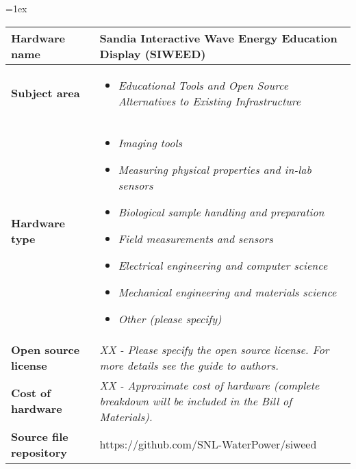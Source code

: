 \documentclass[11pt, letterpaper]{article}
\begin{document}
\begin{flushleft}
\tabulinesep=1ex
\begin{tabu} to \linewidth {|X|X[3,l]|}
\hline  \textbf{Hardware name} & Sandia Interactive Wave Energy Education Display (SIWEED)
  \\
  \hline \textbf{Subject area} & %
  \begin{itemize}
  \item \textit{Educational Tools and Open Source Alternatives to Existing Infrastructure}
  \end{itemize}
  \\
  \hline \textbf{Hardware type} &
  \begin{itemize}
  \item \textit{Imaging tools}
  \item \textit{Measuring physical properties and in-lab sensors}
  \item \textit{Biological sample handling and preparation}
  \item \textit{Field measurements and sensors}
  \item \textit{Electrical engineering and computer science}
  \item \textit{Mechanical engineering and materials science}
  \item \textit{Other (please specify)}
  \end{itemize}
  \\ 
\hline \textbf{Open source license} &
  \textit{XX - Please specify the open source license. For more details see the guide to authors.}
  \\
\hline \textbf{Cost of hardware} &
  \textit{XX - Approximate cost of hardware (complete breakdown will be included in the Bill of Materials).}
  \\
\hline \textbf{Source file repository} & 
  https://github.com/SNL-WaterPower/siweed
\\\hline
\end{tabu}
 
\end{flushleft}
\end{document}
